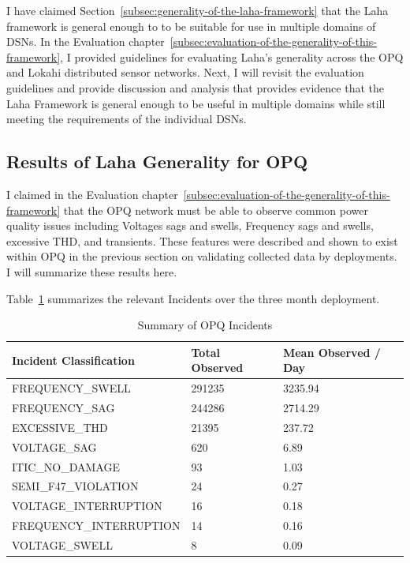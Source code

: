I have claimed Section~\ref{subsec:generality-of-the-laha-framework} that the Laha framework is general enough to to be suitable for use in multiple domains of DSNs. In the Evaluation chapter~\ref{subsec:evaluation-of-the-generality-of-this-framework}, I provided guidelines for evaluating Laha's generality across the OPQ and Lokahi distributed sensor networks. Next, I will revisit the evaluation guidelines and provide discussion and analysis that provides evidence that the Laha Framework is general enough to be useful in multiple domains while still meeting the requirements of the individual DSNs.

\subsection{Results of Laha Generality for OPQ}\label{subsec:results-of-laha-generality-for-opq}

I claimed in the Evaluation chapter~\ref{subsec:evaluation-of-the-generality-of-this-framework} that the OPQ network must be able to observe common power quality issues including Voltages sags and swells, Frequency sags and swells, excessive THD, and transients. These features were described and shown to exist within OPQ in the previous section on validating collected data by deployments. I will summarize these results here.

Table~\ref{table:incidents_summary} summarizes the relevant Incidents over the three month deployment.

\begin{table}[H]
    \centering
    \caption{Summary of OPQ Incidents}
    \begin{tabularx}{\textwidth}{Xll}
        \toprule
        \textbf{Incident Classification} & \textbf{Total Observed} & \textbf{Mean Observed / Day} \\
        \midrule
        FREQUENCY\_SWELL & 291235 & 3235.94 \\
        FREQUENCY\_SAG & 244286 & 2714.29 \\
        EXCESSIVE\_THD & 21395 & 237.72 \\
        VOLTAGE\_SAG & 620 & 6.89 \\
        ITIC\_NO\_DAMAGE & 93 & 1.03 \\
        SEMI\_F47\_VIOLATION & 24 & 0.27 \\
        VOLTAGE\_INTERRUPTION & 16 & 0.18 \\
        FREQUENCY\_INTERRUPTION & 14 & 0.16 \\
        VOLTAGE\_SWELL & 8 & 0.09 \\
        \bottomrule
    \end{tabularx}
    \label{table:incidents_summary}
\end{table}

